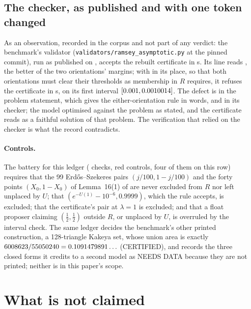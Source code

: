 \documentclass[11pt]{article}
\begin{document}
\subsection{The checker, as published and with one token changed}

As an observation, recorded in the corpus and not part of any verdict: the benchmark's validator (\texttt{validators/\allowbreak ramsey\_asymptotic.py} at the pinned commit), run as published on \HmObservedOn, accepts the rebuilt certificate in \HmCheckerSeconds{} s. Its line \HmCheckerLine{} reads \texttt{\HmCheckerMin}, the better of the two orientations' margins; with \texttt{\HmCheckerMax} in its place, so that both orientations must clear their thresholds as membership in $R$ requires, it refuses the certificate in \HmWithAndSeconds{} s, on its first interval $[0.001,0.0010014]$. The defect is in the problem statement, which gives the either-orientation rule in words, and in its checker; the model optimised against the problem as stated, and the certificate reads as a faithful solution of that problem. The verification that relied on the checker is what the record contradicts.

\paragraph{Controls.} The battery for this ledger (\HmBattery{} checks, \HmRed{} red controls, four of them on this row) requires that the 99 Erd\H{o}s--Szekeres pairs $(j/100,1-j/100)$ and the forty points $(X_0,1-X_0)$ of Lemma~16(1) of \cite{GNNW} are never excluded from $R$ nor left unplaced by $U$; that $(e^{-U(1)}-10^{-6},0.9999)$, which the rule accepts, is excluded; that the certificate's pair at $\lambda=1$ is excluded; and that a float proposer claiming $(\tfrac12,\tfrac12)$ outside $R$, or unplaced by $U$, is overruled by the interval check. The same ledger decides the benchmark's other printed construction, a 128-triangle Kakeya set, whose union area is exactly $6008623/55050240=0.1091479891\ldots$ (CERTIFIED), and records the three closed forms it credits to a second model as NEEDS DATA because they are not printed; neither is in this paper's scope.

\section{What is not claimed}
\end{document}
